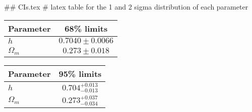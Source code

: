 ## CIs.tex
# latex table for the 1 and 2 sigma distribution of each parameter

\begin{tabular} { l  c}
 Parameter &  68\% limits\\
\hline
{\boldmath$h              $} & $0.7040\pm 0.0066          $\\
{\boldmath$\Omega_m       $} & $0.273\pm 0.018            $\\
\hline
\end{tabular}

\begin{tabular} { l  c}
 Parameter &  95\% limits\\
\hline
{\boldmath$h              $} & $0.704^{+0.013}_{-0.013}   $\\
{\boldmath$\Omega_m       $} & $0.273^{+0.037}_{-0.034}   $\\
\hline
\end{tabular}
